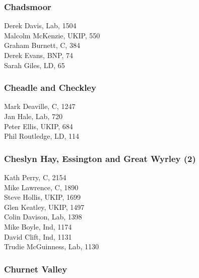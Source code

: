\documentclass[a4paper,openany,10pt]{book}
\begin{document}
\subsubsection*{Chadsmoor}



Derek Davis, Lab, 1504\\
Malcolm McKenzie, UKIP, 550\\
Graham Burnett, C, 384\\
Derek Evans, BNP, 74\\
Sarah Giles, LD, 65\\


\subsubsection*{Cheadle and Checkley}



Mark Deaville, C, 1247\\
Jan Hale, Lab, 720\\
Peter Ellis, UKIP, 684\\
Phil Routledge, LD, 114\\


\subsubsection*{Cheslyn Hay, Essington and Great Wyrley (2)}



Kath Perry, C, 2154\\
Mike Lawrence, C, 1890\\
Steve Hollis, UKIP, 1699\\
Glen Keatley, UKIP, 1497\\
Colin Davison, Lab, 1398\\
Mike Boyle, Ind, 1174\\
David Clift, Ind, 1131\\
Trudie McGuinness, Lab, 1130\\


\subsubsection*{Churnet Valley}

\end{document}
